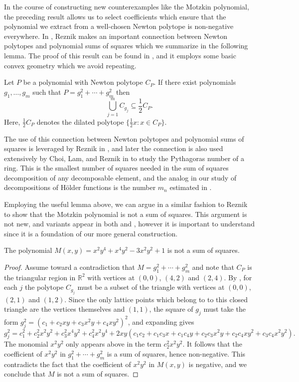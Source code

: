 \documentclass[oneside,hidelinks,indentfirst,10pt]{book}
\begin{document}
In the course of constructing new counterexamples like the Motzkin polynomial, the preceding result allows us to select coefficients which ensure that the polynomial we extract from a well-chosen Newton polytope is non-negative everywhere. In \cite{reznik_extpsd}, Reznik makes an important connection between Newton polytopes and polynomial sums of squares which we summarize in the following lemma. The proof of this result can be found in \cite[Theorem 1]{reznik_extpsd}, and it employs some basic convex geometry which we avoid repeating. 


\begin{lem}[Reznik]\label{lem:rezlem}
Let \(P\) be a polynomial with Newton polytope \(C_P\). If there exist polynomials \(g_1,\dots,g_m\) such that \(P=g_1^2+\cdots+g_m^2\) then 
\[
    \bigcup_{j=1}^m C_{g_j}\subseteq \frac{1}{2}C_P.
\]
Here, \(\frac{1}{2}C_{P}\) denotes the dilated polytope \(\{\frac{1}{2}x:x\in C_{P}\}\).
\end{lem}


The use of this connection between Newton polytopes and polynomial sums of squares is leveraged by Reznik in \cite{reznik_extpsd}, and later the connection is also used extensively by Choi, Lam, and Reznik in \cite{CLR} to study the Pythagoras number of a ring. This is the smallest number of squares needed in the sum of squares decomposition of any decomposable element, and the analog in our study of decompositions of H\"older functions is the number \(m_n\) estimated in . 


Employing the useful lemma above, we can argue in a similar fashion to Reznik to show that the Motzkin polynomial is not a sum of squares. This argument is not new, and variants appear in both \cite{reznik_extpsd} and \cite{Powers}, however it is important to understand since it is a foundation of our more general construction.


\begin{cor}
The polynomial \(M(x,y)=x^2y^4+x^4y^2-3x^2y^2+1\) is not a sum of squares.
\end{cor}

\begin{proof}
Assume toward a contradiction that \(M=g_1^2+\cdots+g_m^2\) and note that \(C_P\) is the triangular region in \(\mathbb{R}^2\) with vertices at \((0,0)\), \((4,2)\) and \((2,4)\). By , for each \(j\) the polytope \(C_{g_j}\) must be a subset of the triangle with vertices at \((0,0)\), \((2,1)\) and \((1,2)\). Since the only lattice points which belong to to this closed triangle are the vertices themselves and \((1,1)\), the square of \(g_j\) must take the form \(g_j^2=(c_1+c_2xy+c_3x^2y+c_4xy^2)^2\), and expanding gives
\[
    g_j^2=c_1^2+c_2^2x^2y^2+c_3^2x^4y^2+c_4^2x^2y^4+2xy(c_1c_2+c_1c_3x+c_1c_4y+c_2c_3x^2y+c_2c_4xy^2+c_3c_4x^2y^2).
\]
The monomial \(x^2y^2\) only appears above in the term \(c_2^2x^2y^2\). It follows that the coefficient of \(x^2y^2\) in \(g_1^2+\cdots+g_m^2\) is a sum of squares, hence non-negative. This contradicts the fact that the coefficient of \(x^2y^2\) in \(M(x,y)\) is negative, and we conclude that \(M\) is not a sum of squares.
\end{proof}
\end{document}
